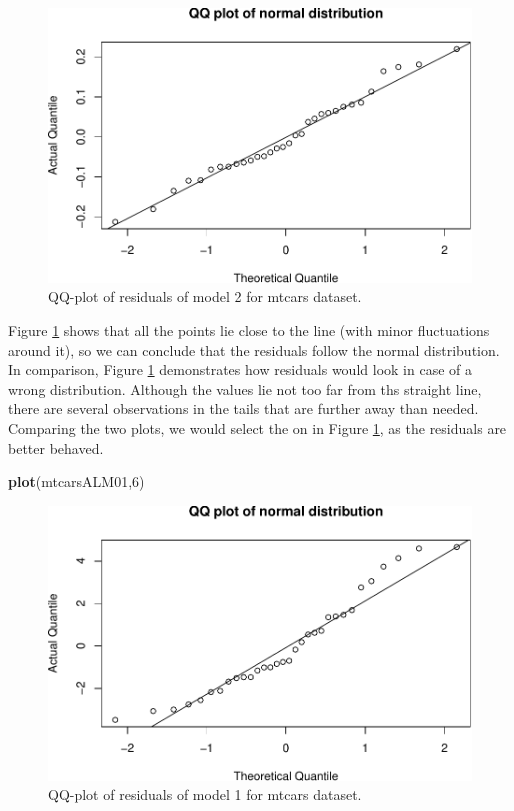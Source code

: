 \documentclass[
]{book}
\newenvironment{Shaded}{\begin{snugshade}}{\end{snugshade}}
\newcommand{\DecValTok}[1]{\textcolor[rgb]{0.00,0.00,0.81}{#1}}
\newcommand{\KeywordTok}[1]{\textcolor[rgb]{0.13,0.29,0.53}{\textbf{#1}}}
\newcommand{\NormalTok}[1]{#1}
\theoremstyle{definition}
\theoremstyle{definition}
\theoremstyle{definition}
\theoremstyle{definition}
\theoremstyle{remark}
\begin{document}
\begin{figure}
\centering
\includegraphics{Svetunkov---Statistics-for-Business-Analytics_files/figure-latex/diagnostics12-1.pdf}
\caption{\label{fig:diagnostics12}QQ-plot of residuals of model 2 for mtcars dataset.}
\end{figure}

Figure \ref{fig:diagnostics12} shows that all the points lie close to the line (with minor fluctuations around it), so we can conclude that the residuals follow the normal distribution. In comparison, Figure \ref{fig:diagnostics12} demonstrates how residuals would look in case of a wrong distribution. Although the values lie not too far from ths straight line, there are several observations in the tails that are further away than needed. Comparing the two plots, we would select the on in Figure \ref{fig:diagnostics12}, as the residuals are better behaved.

\begin{Shaded}
\begin{Highlighting}[]
\KeywordTok{plot}\NormalTok{(mtcarsALM01,}\DecValTok{6}\NormalTok{)}
\end{Highlighting}
\end{Shaded}

\begin{figure}
\centering
\includegraphics{Svetunkov---Statistics-for-Business-Analytics_files/figure-latex/diagnostics13-1.pdf}
\caption{\label{fig:diagnostics13}QQ-plot of residuals of model 1 for mtcars dataset.}
\end{figure}
\end{document}
